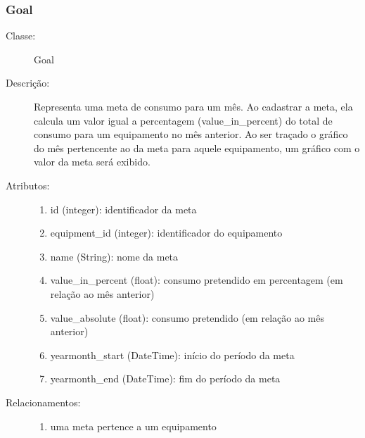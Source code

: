 \subsubsection{Goal}
\begin{description}
	\item[Classe:] Goal
	\item[Descrição:] Representa uma meta de consumo para um mês. Ao cadastrar a meta, ela calcula um valor igual a percentagem (value\_in\_percent) do total de consumo para um equipamento no mês anterior. Ao ser traçado o gráfico do mês pertencente ao da meta para aquele equipamento, um gráfico com o valor da meta será exibido.
	\item[Atributos:] \hfill
		\begin{enumerate}
			\item id (integer): identificador da meta
			\item equipment\_id (integer): identificador do equipamento
			\item name (String):  nome da meta
			\item value\_in\_percent (float): consumo pretendido em percentagem (em relação ao mês anterior)
			\item value\_absolute (float): consumo pretendido (em relação ao mês anterior)
			\item yearmonth\_start (DateTime): início do período da meta
		    \item yearmonth\_end (DateTime): fim do período da meta
		\end{enumerate}
	\item[Relacionamentos:] \hfill
		\begin{enumerate}
			\item uma meta pertence a um equipamento
		\end{enumerate}
\end{description} 
%
